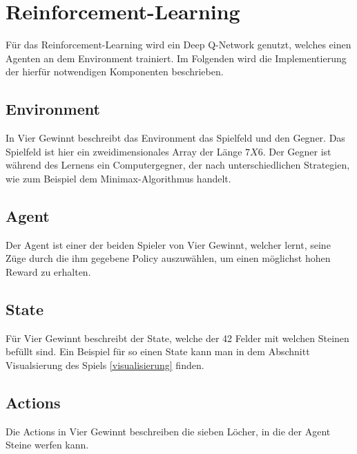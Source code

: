 \section{Reinforcement-Learning}
Für das Reinforcement-Learning wird ein Deep Q-Network genutzt, welches einen Agenten an dem Environment trainiert. Im Folgenden wird die Implementierung der hierfür notwendigen Komponenten beschrieben. 


\subsection{Environment}
In Vier Gewinnt beschreibt das Environment das Spielfeld und den Gegner. Das Spielfeld ist hier ein zweidimensionales Array der Länge $7 X 6$. Der Gegner ist während des Lernens ein Computergegner, der nach unterschiedlichen Strategien, wie zum Beispiel dem Minimax-Algorithmus handelt. \\

\subsection{Agent}
Der Agent ist einer der beiden Spieler von Vier Gewinnt, welcher lernt, seine Züge durch die ihm gegebene Policy auszuwählen, um einen möglichst hohen Reward zu erhalten.\\

\subsection{State}
 Für Vier Gewinnt beschreibt der State, welche der 42 Felder mit welchen Steinen befüllt sind. Ein Beispiel für so einen State kann man in dem Abschnitt Visualsierung des Spiels \ref{visualisierung} finden.\\


\subsection{Actions}
Die Actions in Vier Gewinnt beschreiben die sieben Löcher, in die der Agent Steine werfen kann.\\

